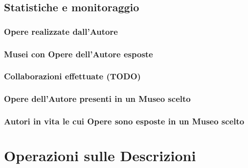 \documentclass[a4paper,11pt]{article}
\begin{document}
\subsection{Statistiche e monitoraggio}
\subsubsection{Opere realizzate dall’Autore}
\subsubsection{Musei con Opere dell’Autore esposte}
\subsubsection{Collaborazioni effettuate (TODO)}
\subsubsection{Opere dell’Autore presenti in un Museo scelto}
\subsubsection{Autori in vita le cui Opere sono esposte in un Museo scelto}

\section{Operazioni sulle Descrizioni}

\end{document}
